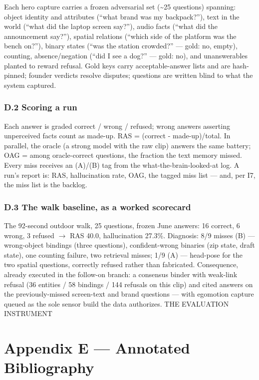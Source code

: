 Each hero capture carries a frozen adversarial set (\textasciitilde25 questions) spanning: object identity and attributes (``what brand was my backpack?''), text in the world (``what did the laptop screen say?''), audio facts (``what did the announcement say?''), spatial relations (``which side of the platform was the bench on?''), binary states (``was the station crowded?'' --- gold: no, empty), counting, absence/negation (``did I see a dog?'' --- gold: no), and unanswerables planted to reward refusal. Gold keys carry acceptable-answer lists and are hash-pinned; founder verdicts resolve disputes; questions are written blind to what the system captured.

\subsection{D.2 Scoring a run}\label{d.2-scoring-a-run}

Each answer is graded correct / wrong / refused; wrong answers asserting unperceived facts count as made-up. RAS = (correct - made-up)/total. In parallel, the oracle (a strong model with the raw clip) answers the same battery; OAG = among oracle-correct questions, the fraction the text memory missed. Every miss receives an (A)/(B) tag from the what-the-brain-looked-at log. A run's report is: RAS, hallucination rate, OAG, the tagged miss list --- and, per I7, the miss list is the backlog.

\subsection{D.3 The walk baseline, as a worked scorecard}\label{d.3-the-walk-baseline-as-a-worked-scorecard}

The 92-second outdoor walk, 25 questions, frozen June answers: 16 correct, 6 wrong, 3 refused \(\rightarrow\) RAS 40.0, hallucination 27.3\%. Diagnosis: 8/9 misses (B) --- wrong-object bindings (three questions), confident-wrong binaries (zip state, draft state), one counting failure, two retrieval misses; 1/9 (A) --- head-pose for the two spatial questions, correctly refused rather than fabricated. Consequence, already executed in the follow-on branch: a consensus binder with weak-link refusal (36 entities / 58 bindings / 144 refusals on this clip) and cited answers on the previously-missed screen-text and brand questions --- with egomotion capture queued as the sole sensor build the data authorizes. THE EVALUATION INSTRUMENT

\chapter*{Appendix E --- Annotated Bibliography}\label{appendix-e-annotated-bibliography}

